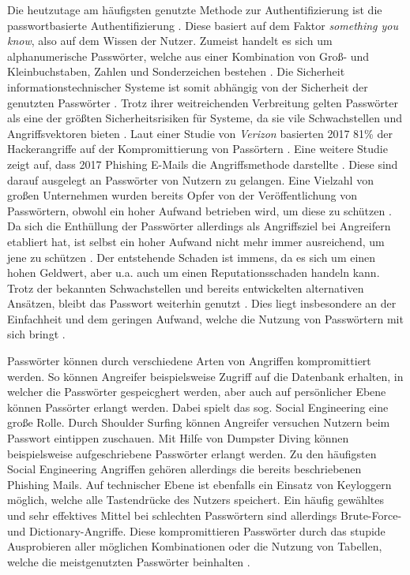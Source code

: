     Die heutzutage am häufigsten genutzte Methode zur Authentifizierung ist die passwortbasierte Authentifizierung \cite{chanda2016password} \cite{boonkrong2012security} \cite{yildirim2019encouraging}. Diese basiert auf dem Faktor \textit{something you know}, also auf dem Wissen der Nutzer. Zumeist handelt es sich um alphanumerische Passwörter, welche aus einer Kombination von Groß- und Kleinbuchstaben, Zahlen und Sonderzeichen bestehen \cite{chanda2016password}. Die Sicherheit informationstechnischer Systeme ist somit abhängig von der Sicherheit der genutzten Passwörter \cite{boonkrong2012security}. Trotz ihrer weitreichenden Verbreitung gelten Passwörter als eine der größten Sicherheitsrisiken für Systeme, da sie vile Schwachstellen und Angriffsvektoren bieten \cite{yildirim2019encouraging} \cite{farke2020you}. Laut einer Studie von \textit{Verizon} basierten 2017 81\% der Hackerangriffe auf der Kompromittierung von Passörtern \cite{barbosa2021provable} \cite{verizon2017}. Eine weitere Studie zeigt auf, dass 2017 Phishing E-Mails die Angriffsmethode darstellte \cite{Symantec} \cite{barbosa2021provable}. Diese sind darauf ausgelegt an Passwörter von Nutzern zu gelangen. Eine Vielzahl von großen Unternehmen wurden bereits Opfer von der Veröffentlichung von Passwörtern, obwohl ein hoher Aufwand betrieben wird, um diese zu schützen \cite{boonkrong2012security}. Da sich die Enthüllung der Passwörter allerdings als Angriffsziel bei Angreifern etabliert hat, ist selbst ein hoher Aufwand nicht mehr immer ausreichend, um jene zu schützen \cite{boonkrong2012security}. Der entstehende Schaden ist immens, da es sich um einen hohen Geldwert, aber u.a. auch um einen Reputationsschaden handeln kann. Trotz der bekannten Schwachstellen und bereits entwickelten alternativen Ansätzen, bleibt das Passwort weiterhin genutzt \cite{ives2004domino}. Dies liegt insbesondere an der Einfachheit und dem geringen Aufwand, welche die Nutzung von Passwörtern mit sich bringt \cite{yildirim2019encouraging}.

    Passwörter können durch verschiedene Arten von Angriffen kompromittiert werden. So können Angreifer beispielsweise Zugriff auf die Datenbank erhalten, in welcher die Passwörter gespeicghert werden, aber auch auf persönlicher Ebene können Passörter erlangt werden. Dabei spielt das sog. Social Engineering eine große Rolle. Durch Shoulder Surfing können Angreifer versuchen Nutzern beim Passwort eintippen zuschauen. Mit Hilfe von Dumpster Diving können beispielsweise aufgeschriebene Passwörter erlangt werden. Zu den häufigsten Social Engineering Angriffen gehören allerdings die bereits beschriebenen Phishing Mails. Auf technischer Ebene ist ebenfalls ein Einsatz von Keyloggern möglich, welche alle Tastendrücke des Nutzers speichert. Ein häufig gewähltes und sehr effektives Mittel bei schlechten Passwörtern sind allerdings Brute-Force- und Dictionary-Angriffe. Diese kompromittieren Passwörter durch das stupide Ausprobieren aller möglichen Kombinationen oder die Nutzung von Tabellen, welche die meistgenutzten Passwörter beinhalten \cite{chanda2016password} \cite{morii2017research}.

